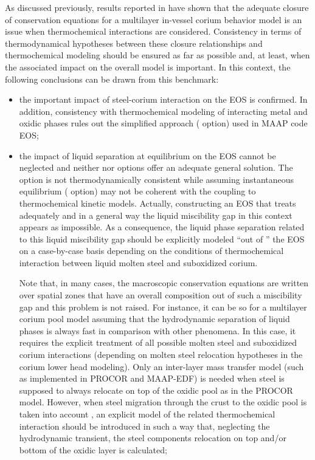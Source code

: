 As discussed previously, results reported in \cite{Bakouta2015} have shown that the adequate closure of conservation equations for a multilayer in-vessel corium behavior model is an issue when thermochemical interactions are considered. Consistency in terms of thermodynamical hypotheses between these closure relationships and thermochemical modeling should be ensured as far as possible and, at least, when the associated impact on the overall model is important. In this context, the following conclusions can be drawn from this benchmark: 
\begin{itemize}
 \item the important impact of steel-corium interaction on the EOS is confirmed. In addition, consistency with thermochemical modeling of interacting metal and oxidic phases rules out the simplified approach ( option) used in MAAP code EOS;

 \item the impact of liquid separation at equilibrium on the EOS cannot be neglected and neither  nor  options offer an adequate general solution. The  option is not thermodynamically consistent while assuming instantaneous equilibrium ( option) may not be coherent with the coupling to thermochemical kinetic models. Actually, constructing an EOS that treats adequately and in a general way the liquid miscibility gap in this context appears as impossible. As a consequence, the liquid phase separation related to this liquid miscibility gap should be explicitly modeled ``out of '' the EOS on a case-by-case basis depending on the conditions of thermochemical interaction between liquid molten steel and suboxidized corium. 
 
 
 Note that, in many cases, the macroscopic conservation equations are written over spatial zones that have an overall composition out of such a miscibility gap and this problem is not raised. For instance, it can be so for a multilayer corium pool model assuming that the hydrodynamic separation of liquid phases is always fast in comparison with other phenomena. In this case, it requires the explicit treatment of all possible molten steel and suboxidized corium interactions (depending on molten steel relocation hypotheses in the corium lower head modeling). Only an inter-layer mass transfer model (such as \cite{LeTellier2014} implemented in PROCOR and MAAP-EDF) is needed when steel is supposed to always relocate on top of the oxidic pool as in the PROCOR model. However, when steel migration through the crust to the oxidic pool is taken into account , an explicit model of the related thermochemical interaction should be introduced in such a way that, neglecting the hydrodynamic transient, the steel components relocation on top and/or bottom of the oxidic layer is calculated;
 

\end{itemize}
